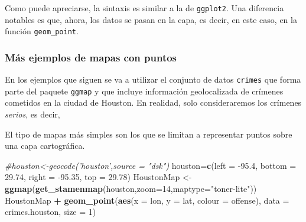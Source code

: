 \documentclass[]{article}
\newenvironment{Shaded}{\begin{snugshade}}{\end{snugshade}}
\newcommand{\CommentTok}[1]{\textcolor[rgb]{0.56,0.35,0.01}{\textit{#1}}}
\newcommand{\DataTypeTok}[1]{\textcolor[rgb]{0.13,0.29,0.53}{#1}}
\newcommand{\DecValTok}[1]{\textcolor[rgb]{0.00,0.00,0.81}{#1}}
\newcommand{\FloatTok}[1]{\textcolor[rgb]{0.00,0.00,0.81}{#1}}
\newcommand{\KeywordTok}[1]{\textcolor[rgb]{0.13,0.29,0.53}{\textbf{#1}}}
\newcommand{\NormalTok}[1]{#1}
\newcommand{\OperatorTok}[1]{\textcolor[rgb]{0.81,0.36,0.00}{\textbf{#1}}}
\newcommand{\StringTok}[1]{\textcolor[rgb]{0.31,0.60,0.02}{#1}}
\numberwithin{ejcnt}{section}
\begin{document}
Como puede apreciarse, la sintaxis es similar a la de \texttt{ggplot2}. Una diferencia notables es que, ahora, los datos se pasan en la capa, es decir, en este caso, en la función \texttt{geom\_point}.

\hypertarget{mas-ejemplos-de-mapas-con-puntos}{%
\subsubsection{Más ejemplos de mapas con puntos}\label{mas-ejemplos-de-mapas-con-puntos}}

En los ejemplos que siguen se va a utilizar el conjunto de datos \texttt{crimes} que forma parte del paquete \texttt{ggmap} y que incluye información geolocalizada de crímenes cometidos en la ciudad de Houston. En realidad, solo consideraremos los crímenes \emph{serios}, es decir,

\begin{Shaded}
\end{Shaded}

El tipo de mapas más simples son los que se limitan a representar puntos sobre una capa cartográfica.

\begin{Shaded}
\begin{Highlighting}[]
\CommentTok{#houston<-geocode('houston',source = "dsk")}
\NormalTok{houston=}\KeywordTok{c}\NormalTok{(}\DataTypeTok{left =} \FloatTok{-95.4}\NormalTok{, }\DataTypeTok{bottom =} \FloatTok{29.74}\NormalTok{, }\DataTypeTok{right =} \FloatTok{-95.35}\NormalTok{, }\DataTypeTok{top =} \FloatTok{29.78}\NormalTok{)}
\NormalTok{HoustonMap <-}\StringTok{ }\KeywordTok{ggmap}\NormalTok{(}\KeywordTok{get_stamenmap}\NormalTok{(houston,}\DataTypeTok{zoom=}\DecValTok{14}\NormalTok{,}\DataTypeTok{maptype=}\StringTok{"toner-lite"}\NormalTok{))}
\NormalTok{HoustonMap }\OperatorTok{+}
\StringTok{  }\KeywordTok{geom_point}\NormalTok{(}\KeywordTok{aes}\NormalTok{(}\DataTypeTok{x =}\NormalTok{ lon, }\DataTypeTok{y =}\NormalTok{ lat, }\DataTypeTok{colour =}\NormalTok{ offense), }\DataTypeTok{data =}\NormalTok{ crimes.houston, }\DataTypeTok{size =} \DecValTok{1}\NormalTok{)}
\end{Highlighting}
\end{Shaded}
\end{document}
